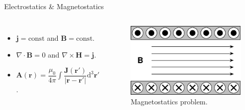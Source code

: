 \begin{frame}{Electrostatics \& Magnetostatics}
\begin{columns}
        \begin{itemize}
            \item \( \mathbf{j} = \text{const} \) and \( \mathbf{B} = \text{const} \).
            \item \( \nabla \cdot \mathbf{B} = 0 \) and \( \nabla \times \mathbf{H} = \mathbf{j} \).
            \item \( \mathbf{A}(\mathbf{r}) = \dfrac{\mu_{0}}{4\pi} \int{ \dfrac{\mathbf{J(\mathbf{r}')} } {|\mathbf{r}-\mathbf{r}'|} \mathrm{d}^3\mathbf{r}'} \).
        \end{itemize}
        
        \vspace{-2mm}
        \begin{figure}[!htb]
        \centering
        \includegraphics[width=\textwidth]{Figures/Soleloid.pdf}
        \caption{Magnetostatics problem.}
        \label{Soleloid}
        \end{figure}
    \end{columns}
\end{frame}